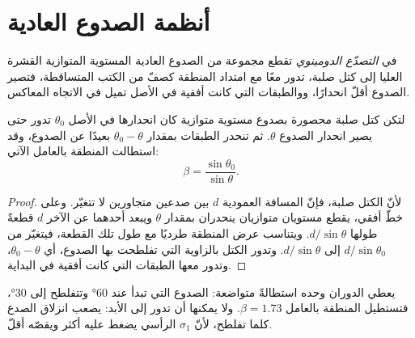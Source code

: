 \begin{omfigure}
\par{}\label{fig:b3:extension-strike-slip:models}
\end{omfigure}

\section{أنظمة الصدوع العادية}\label{sec:b3:extension-strike-slip:faults}

\begin{definition}\label{def:b3:extension-strike-slip:domino}
في \emph{التصدّع الدومينوي} تقطع مجموعة من الصدوع العادية المستوية المتوازية
القشرة العليا إلى كتل صلبة، تدور معًا مع امتداد المنطقة
كصفّ من الكتب المتساقطة، فتصير الصدوع أقلّ انحدارًا،
ووالطبقات التي كانت أفقية في الأصل تميل في الاتجاه المعاكس.
\end{definition}

\begin{theorem}\label{thm:b3:extension-strike-slip:domino}
لتكن كتل صلبة محصورة بصدوع مستوية متوازية كان انحدارها في الأصل
$\theta_0$ تدور حتى يصير انحدار الصدوع $\theta$. ثم تنحدر الطبقات بمقدار $\theta_0
- \theta$ بعيدًا عن الصدوع، وقد استطالت المنطقة بالعامل
الآتي:
\[
  \beta = \frac{\sin\theta_0}{\sin\theta} .
\]
\end{theorem}

\begin{proof}
لأنّ الكتل صلبة، فإنّ المسافة العمودية $d$ بين صدعين
متجاورين لا تتغيّر. وعلى خطّ أفقي، يقطع مستويان متوازيان ينحدران بمقدار
$\theta$ ويبعد أحدهما عن الآخر $d$ قطعةً طولها $d/\sin
\theta$. ويتناسب عرض المنطقة طرديًا مع طول تلك القطعة، فيتغيّر من
$d/\sin\theta_0$ إلى $d/\sin\theta$. وتدور الكتل بالزاوية التي
تفلطحت بها الصدوع، أي $\theta_0 - \theta$، وتدور معها الطبقات
التي كانت أفقية في البداية.
\end{proof}

يعطي الدوران وحده استطالةً متواضعة: الصدوع التي تبدأ عند \ang{60}
وتتفلطح إلى \ang{30}، فتستطيل المنطقة بالعامل $\beta = 1.73$. ولا يمكنها أن تدور
إلى الأبد: يصعب انزلاق الصدع كلما تفلطح، لأنّ $\sigma_1$ الرأسي
يضغط عليه أكثر ويقصّه أقلّ.

